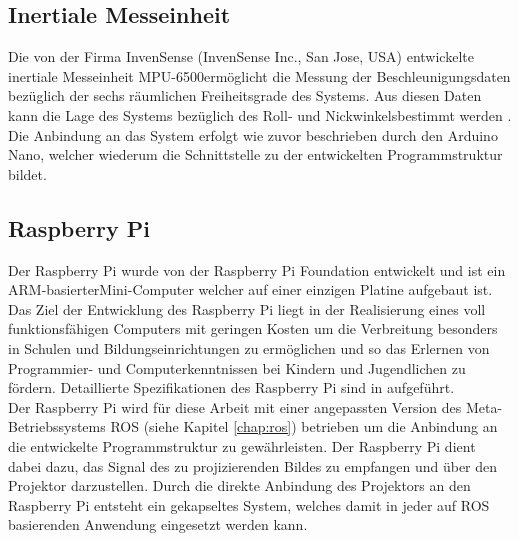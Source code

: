 
\subsection{Inertiale Messeinheit}
\label{chap.imu}
Die von der Firma InvenSense (InvenSense Inc., San Jose, USA) entwickelte inertiale Messeinheit MPU-6500\texttrademark \space ermöglicht die Messung der Beschleunigungsdaten bezüglich der sechs räumlichen Freiheitsgrade des Systems. Aus diesen Daten kann die Lage des Systems bezüglich des Roll- und Nickwinkels\red[footnote] bestimmt werden \cite{IMU}. Die Anbindung an das System erfolgt wie zuvor beschrieben durch den Arduino Nano, welcher wiederum die Schnittstelle zu der entwickelten Programmstruktur bildet.


\subsection{Raspberry Pi}
Der Raspberry Pi wurde von der Raspberry Pi Foundation  entwickelt und ist ein ARM-basierter\red[fußnote?] Mini-Computer welcher auf einer einzigen Platine aufgebaut ist. Das Ziel der Entwicklung des Raspberry Pi liegt in der Realisierung eines voll funktionsfähigen Computers mit geringen Kosten um die Verbreitung besonders in Schulen und Bildungseinrichtungen zu ermöglichen und so das Erlernen von Programmier- und Computerkenntnissen bei Kindern und Jugendlichen zu fördern. Detaillierte Spezifikationen des Raspberry Pi sind in  aufgeführt.\\

Der Raspberry Pi wird für diese Arbeit mit einer angepassten Version des Meta-Betriebssystems ROS (siehe Kapitel \ref{chap:ros}) betrieben um die Anbindung an die entwickelte Programmstruktur zu gewährleisten. Der Raspberry Pi dient dabei dazu, das Signal des zu projizierenden Bildes zu empfangen und über den Projektor darzustellen. Durch die direkte Anbindung des Projektors an den Raspberry Pi entsteht ein gekapseltes System, welches damit in jeder auf ROS basierenden Anwendung eingesetzt werden kann.

